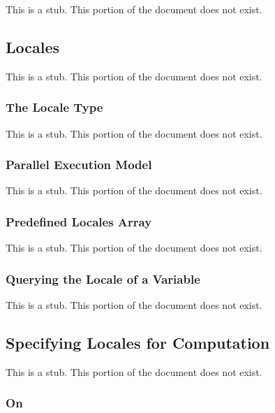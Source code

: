 \label{Locality_and_Distribution}

This is a stub.  This portion of the document does not exist.

\subsection{Locales}
\label{Locales}

This is a stub.  This portion of the document does not exist.

\subsubsection{The Locale Type}
\label{The_Locale_Type}

This is a stub.  This portion of the document does not exist.

\subsubsection{Parallel Execution Model}
\label{Parallel_Execution_Model}

This is a stub.  This portion of the document does not exist.

\subsubsection{Predefined Locales Array}
\label{Predefined_Locales_Array}

This is a stub.  This portion of the document does not exist.

\subsubsection{Querying the Locale of a Variable}
\label{Querying_the_Locale_of_a_Variable}

This is a stub.  This portion of the document does not exist.

\subsection{Specifying Locales for Computation}
\label{Specifying_Locales_for_Computation}

This is a stub.  This portion of the document does not exist.

\subsubsection{On}
\label{On}


